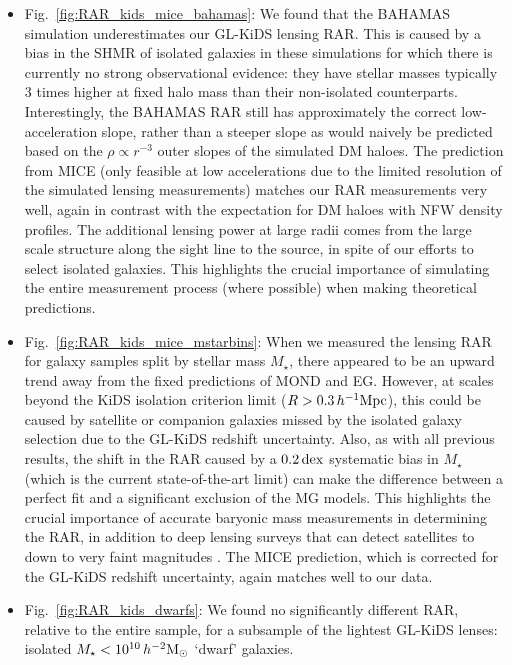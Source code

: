 \documentclass[usenatbib]{mnras}
\newcommand{\hmsun}{\,h^{-2} {\rm M_\odot}}
\newcommand{\hMpc}{\, h^{-1}{\rm{Mpc}} }
\newcommand{\dex}{\, {\rm dex}}
\begin{document}
\begin{itemize}
	\item Fig.~\ref{fig:RAR_kids_mice_bahamas}: We found that the BAHAMAS simulation underestimates our GL-KiDS lensing RAR. This is caused by a bias in the SHMR of isolated galaxies in these simulations for which there is currently no strong observational evidence: they have stellar masses typically $3$ times higher at fixed halo mass than their non-isolated counterparts. Interestingly, the BAHAMAS RAR still has approximately the correct low-acceleration slope, rather than a steeper slope as would naively be predicted based on the $\rho\propto r^{-3}$ outer slopes of the simulated DM haloes. The prediction from MICE (only feasible at low accelerations due to the limited resolution of the simulated lensing measurements) matches our RAR measurements very well, again in contrast with the expectation for DM haloes with NFW density profiles. The additional lensing power at large radii comes from the large scale structure along the sight line to the source, in spite of our efforts to select isolated galaxies. This highlights the crucial importance of simulating the entire measurement process (where possible) when making theoretical predictions.
	
	\item Fig.~\ref{fig:RAR_kids_mice_mstarbins}: When we measured the lensing RAR for galaxy samples split by stellar mass $M_\star$, there appeared to be an upward trend away from the fixed predictions of MOND and EG. However, at scales beyond the KiDS isolation criterion limit ($R>0.3 \hMpc$), this could be caused by satellite or companion galaxies missed by the isolated galaxy selection due to the GL-KiDS redshift uncertainty. Also, as with all previous results, the shift in the RAR caused by a $0.2 \dex$ systematic bias in $M_\star$ (which is the current state-of-the-art limit) can make the difference between a perfect fit and a significant exclusion of the MG models. This highlights the crucial importance of accurate baryonic mass measurements in determining the RAR, in addition to deep lensing surveys that can detect satellites to down to very faint magnitudes \cite[such as the future Euclid survey;][]{laureijs2011}. The MICE prediction, which is corrected for the GL-KiDS redshift uncertainty, again matches well to our data.
	
	\item Fig.~\ref{fig:RAR_kids_dwarfs}: We found no significantly different RAR, relative to the entire sample, for a subsample of the lightest GL-KiDS lenses: isolated $M_\star < 10^{10} \hmsun$ `dwarf' galaxies.
	

\end{itemize}
\end{document}
